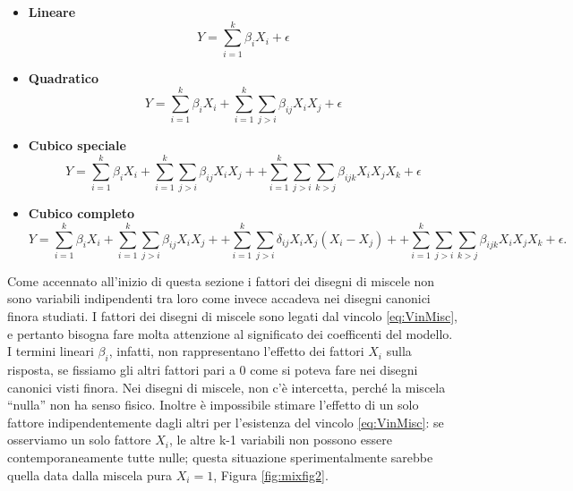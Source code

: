 \documentclass[
  11pt,
]{book}
\providecommand{\tightlist}{%
  \setlength{\itemsep}{0pt}\setlength{\parskip}{0pt}}
\begin{document}
\begin{itemize}
\tightlist
\item
  \textbf{Lineare}
  \begin{equation*}
    Y=\sum_{i=1}^k\beta_iX_i+\epsilon
  \end{equation*}
\item
  \textbf{Quadratico}
  \begin{equation*}
    Y=\sum_{i=1}^k\beta_iX_i+\sum_{i=1}^k\sum_{j>i}\beta_{ij}X_iX_j+\epsilon
  \end{equation*}
\item
  \textbf{Cubico speciale}
  \begin{equation*}
    Y=\sum_{i=1}^k\beta_iX_i+\sum_{i=1}^k\sum_{j>i}\beta_{ij}X_iX_j+
    +\sum_{i=1}^k\sum_{j>i}\sum_{k>j}\beta_{ijk}X_iX_jX_k+\epsilon
  \end{equation*}
\item
  \textbf{Cubico completo}
  \begin{equation*}
    Y=\sum_{i=1}^k\beta_iX_i+\sum_{i=1}^k\sum_{j>i}\beta_{ij}X_iX_j+
    +\sum_{i=1}^k\sum_{j>i}\delta_{ij}X_iX_j(X_i-X_j)+
    +\sum_{i=1}^k\sum_{j>i}\sum_{k>j}\beta_{ijk}X_iX_jX_k+\epsilon.
  \end{equation*}
\end{itemize}

Come accennato all'inizio di questa sezione i fattori dei disegni di miscele non sono variabili indipendenti tra loro come invece accadeva nei disegni canonici finora studiati. I fattori dei disegni di miscele sono legati dal vincolo \eqref{eq:VinMisc}, e pertanto bisogna fare molta attenzione al significato dei coefficenti del modello. I termini lineari \(\beta_i\), infatti, non rappresentano l'effetto dei fattori \(X_i\) sulla risposta, se fissiamo gli altri fattori pari a 0 come si poteva fare nei disegni canonici visti finora. Nei disegni di miscele, non c'è intercetta, perché la miscela ``nulla'' non ha senso fisico. Inoltre è impossibile stimare l'effetto di un solo fattore indipendentemente dagli altri per l'esistenza del vincolo \eqref{eq:VinMisc}: se osserviamo un solo fattore \(X_i\), le altre k-1 variabili non possono essere contemporaneamente tutte nulle; questa situazione sperimentalmente sarebbe quella data dalla miscela pura \(X_i=1\), Figura \ref{fig:mixfig2}.
\end{document}
